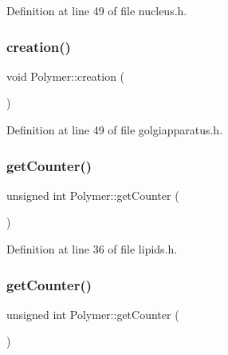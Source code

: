 Definition at line 49 of file nucleus.\+h.

\mbox{\label{class_polymer_a1daba3eb2ba8428bf2f3e814668b155f}} 
\subsubsection{\texorpdfstring{creation()}{creation()}\hspace{0.1cm}{\footnotesize\ttfamily [10/10]}}
{\footnotesize\ttfamily void Polymer\+::creation (\begin{DoxyParamCaption}{ }\end{DoxyParamCaption})\hspace{0.3cm}{\ttfamily [inline]}}



Definition at line 49 of file golgiapparatus.\+h.

\mbox{\label{class_polymer_a8346d821e5f8690d7816ba1d40036b69}} 
\subsubsection{\texorpdfstring{get\+Counter()}{getCounter()}\hspace{0.1cm}{\footnotesize\ttfamily [1/10]}}
{\footnotesize\ttfamily unsigned int Polymer\+::get\+Counter (\begin{DoxyParamCaption}{ }\end{DoxyParamCaption})\hspace{0.3cm}{\ttfamily [inline]}}



Definition at line 36 of file lipids.\+h.

\mbox{\label{class_polymer_a8346d821e5f8690d7816ba1d40036b69}} 
\subsubsection{\texorpdfstring{get\+Counter()}{getCounter()}\hspace{0.1cm}{\footnotesize\ttfamily [2/10]}}
{\footnotesize\ttfamily unsigned int Polymer\+::get\+Counter (\begin{DoxyParamCaption}{ }\end{DoxyParamCaption})\hspace{0.3cm}{\ttfamily [inline]}}



